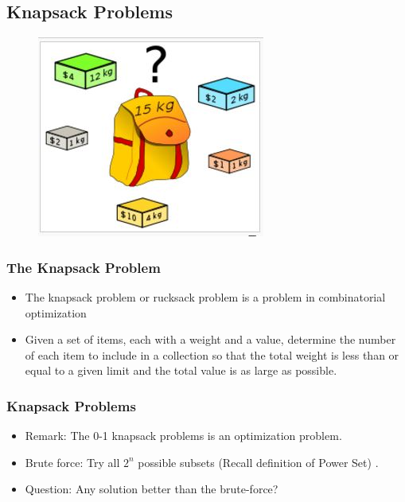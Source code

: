 \documentclass{beamer}
\begin{document}
\subsection{Knapsack Problems}

\begin{frame}
\begin{figure}
\centering
\includegraphics[width=0.7\linewidth]{knapsack}
\caption{}
\label{fig:knapsack}
\end{figure}
\end{frame}
\begin{frame}
	\frametitle{The Knapsack Problem}
\Large
\begin{itemize}
\item The knapsack problem or rucksack problem is a problem in combinatorial optimization
\item Given a set of items, each with a weight and a value, determine the number of each item to include in a collection so that the total weight is less than or equal to a given limit and the total value is as large as possible.
\end{itemize}
	
\end{frame}
\begin{frame}
	\frametitle{Knapsack Problems}
	\Large
	\begin{itemize}
		\item Remark: The 0-1 knapsack problems is an optimization problem.
		\item Brute force: Try all $2^n$ possible subsets (Recall definition of Power Set)
		.
		\item	Question: Any solution better than the brute-force?
	\end{itemize}
\end{frame}
\end{document}
